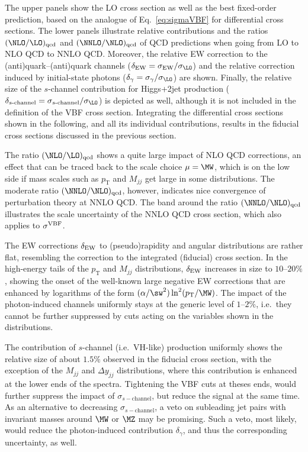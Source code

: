 %
The upper panels show the LO cross section as well as the best fixed-order prediction,
based on the analogue of Eq.~\eqref{eq:sigmaVBF} for differential
cross sections.
The lower panels illustrate relative contributions and the ratios
$(\NLO/\LO)_{\mathrm{qcd}}$ and $(\NNLO/\NLO)_{\mathrm{qcd}}$
of QCD predictions when going from LO to NLO QCD to
NNLO QCD. Moreover, the relative EW correction to the (anti)quark--(anti)quark
channels ($\delta_{\ELWK}=\sigma_{\ELWK}/\sigma_{\LO}$) and the relative correction induced by initial-state 
photons ($\delta_\gamma=\sigma_\gamma/\sigma_\LO$) are shown.
Finally, the relative size of the $s$-channel contribution for
Higgs+2jet production
($\delta_{\mbox{\scriptsize $s$-channel}}=\sigma_{\mbox{\scriptsize $s$-channel}}/\sigma_\LO$) is
depicted as well, although it is not included in the definition of the VBF cross section.
Integrating the differential cross sections shown in the following, and all its
individual contributions, results in the fiducial cross sections discussed in the
previous section.

The ratio $(\NLO/\LO)_{\mathrm{qcd}}$ shows a quite large impact of NLO QCD
corrections, an effect that can be traced back to the scale choice $\mu=\MW$,
which is on the low side if mass scales such as $p_{\mathrm{T}}$ and $M_{jj}$
get large in some distributions. The moderate ratio
$(\NNLO/\NLO)_{\mathrm{qcd}}$, however, indicates nice convergence of perturbation
theory at NNLO QCD. The band around the ratio $(\NNLO/\NLO)_{\mathrm{qcd}}$ illustrates the
scale uncertainty of the NNLO QCD cross section, which also applies to $\sigma^{\mathrm{VBF}}$.

The EW corrections $\delta_{\mathrm{EW}}$ to (pseudo)rapidity and angular distributions are rather flat,
resembling the correction to the integrated (fiducial) cross section.
In the high-energy tails of the $p_{\mathrm{T}}$ and $M_{jj}$ distributions,
$\delta_{\mathrm{EW}}$ increases in size to $10$--$20\%$, showing the onset of the well-known large
negative EW corrections that are enhanced by logarithms of the form
$(\alpha/\sw^2)\ln^2(p_{\mathrm{T}}/\MW)$.
The impact of the photon-induced channels uniformly stays at the generic level of $1$--$2\%$, i.e.\
they cannot be further suppressed by cuts acting on the variables shown in the distributions.

The contribution of $s$-channel (i.e.\ VH-like) production uniformly shows the relative size
of about $1.5\%$ observed in the fiducial cross section, with the exception of the 
$M_{jj}$ and $\Delta y_{jj}$ distributions, where this contribution
is enhanced at the lower ends of the spectra. Tightening the VBF cuts at theses ends, 
would further suppress the impact of $\sigma_{s-\mathrm{channel}}$, but reduce the signal
at the same time. 
As an alternative to decreasing $\sigma_{s-\mathrm{channel}}$, a veto on subleading jet pairs with 
invariant masses around $\MW$ or $\MZ$ may be promising. Such a veto, most likely, would
reduce the photon-induced contribution $\delta_\gamma$, and thus the corresponding uncertainty, as well.

